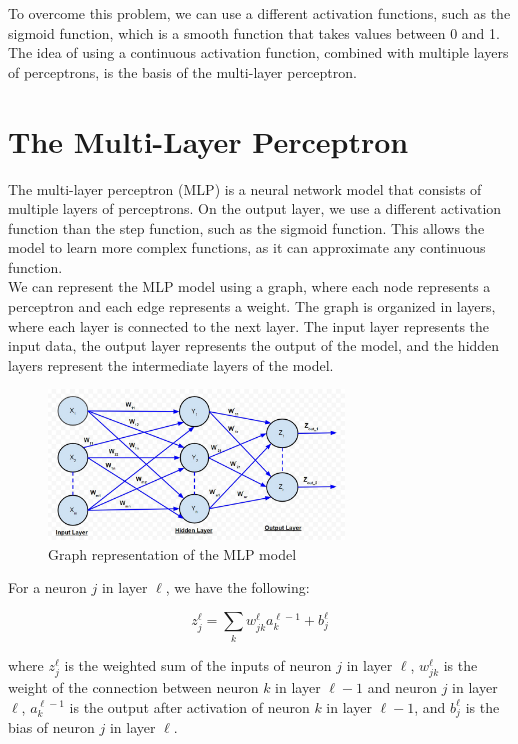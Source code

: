 To overcome this problem, we can use a different activation functions, such as the
sigmoid function, which is a smooth function that takes values between 0 and 1.
The idea of using a continuous activation function, combined with multiple layers
of perceptrons, is the basis of the multi-layer perceptron.


\section{The Multi-Layer Perceptron}

The multi-layer perceptron (MLP) is a neural network model that consists of multiple
layers of perceptrons. On the output layer, we use a different activation function
than the step function, such as the sigmoid function. This allows the model to learn
more complex functions, as it can approximate any continuous function.\\

We can represent the MLP model using a graph, where each node represents a perceptron
and each edge represents a weight. The graph is organized in layers, where each layer
is connected to the next layer. The input layer represents the input data, the output
layer represents the output of the model, and the hidden layers represent the intermediate
layers of the model.\\

\begin{figure}[H]
    \centering
    \includegraphics[width=0.7\textwidth]{figures/MLP.jpg}
    \caption{Graph representation of the MLP model}
    \label{fig:mlp_graph}
\end{figure}

For a neuron $j$ in layer $\ell$, we have the following:

\begin{equation}
    z_j^\ell = \sum_{k} w_{jk}^\ell a_k^{\ell-1} + b_j^\ell
\end{equation}

where $z_j^\ell$ is the weighted sum of the inputs of neuron $j$ in layer $\ell$,
$w_{jk}^\ell$ is the weight of the connection between neuron $k$ in layer $\ell-1$
and neuron $j$ in layer $\ell$, $a_k^{\ell-1}$ is the output after activation
of neuron $k$ in layer $\ell-1$, and $b_j^\ell$ is the bias of neuron $j$ in 
layer $\ell$.\\

